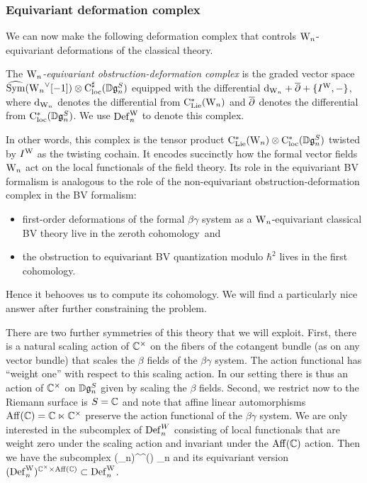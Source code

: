 \subsubsection{Equivariant deformation complex} \label{sec eq def cplx}

We can now make the following deformation complex that controls ${{\rm W}_n}$-equivariant deformations of the classical theory. 

\begin{dfn}
The {\em ${{\rm W}_n}$-equivariant obstruction-deformation complex} is 
the graded vector space $\widehat{{\rm Sym}}({{\rm W}_n}^\vee[-1]) \otimes {\rm C}^\sharp_{\rm loc}(\mathbb D\mathfrak{g}_n^S)$ 
equipped with the differential ${\rm d}_{{{\rm W}_n}} + \overline{\partial} + \{I^{\rm W},-\}$, 
where ${\rm d}_{{{\rm W}_n}}$ denotes the differential from ${\rm C}_{\rm Lie}^*({{\rm W}_n})$
and $\overline{\partial}$ denotes the differential from ${\rm C}^*_{\rm loc}(\mathbb D\mathfrak{g}_n^S)$.
We use ${\rm Def}^{\rm W}_n$ to denote this complex.
\end{dfn}

In other words, this complex is the tensor product ${\rm C}_{\rm Lie}^*({{\rm W}_n}) \otimes {\rm C}^*_{\rm loc}(\mathbb D\mathfrak{g}_n^S)$
twisted by $I^{\rm W}$ as the twisting cochain.
It encodes succinctly how the formal vector fields ${{\rm W}_n}$ act on the local functionals of the field theory.
Its role in the equivariant BV formalism is analogous to the role of the non-equivariant obstruction-deformation complex in the BV formalism:
\begin{itemize}
\item first-order deformations of the formal $\beta\gamma$ system as a ${{\rm W}_n}$-equivariant classical BV theory live in the zeroth cohomology~and
\item the obstruction to equivariant BV quantization modulo $\hbar^2$ lives in the first cohomology.
\end{itemize}
Hence it behooves us to compute its cohomology.
We will find a particularly nice answer after further constraining the problem.

There are two further symmetries of this theory that we will exploit.
First, there is a natural scaling action of $\mathbb C^\times$ on the fibers of the cotangent bundle (as on any vector bundle)
that scales the $\beta$ fields of the $\beta\gamma$ system.
The action functional has ``weight one'' with respect to this scaling action.
In our setting there is thus an action of $\mathbb C^\times$ on $\mathbb D \mathfrak{g}_n^S$ given by scaling the $\beta$ fields. 
Second, we restrict now to the Riemann surface is $S = \mathbb C$ and 
note that affine linear automorphisms ${\rm Aff}(\mathbb C) = \mathbb C \ltimes \mathbb C^\times$ preserve the action functional
of the $\beta\gamma$ system.
We are only interested in the subcomplex of ${\rm Def}^{W}_n$ consisting of local functionals that are weight zero under the scaling action and invariant under the ${\rm Aff}(\mathbb C)$ action.
Then we have the subcomplex
\ben
(\Def_n)^{\CC^\times {}(\CC)} \subset \Def_n
\een
and its equivariant version $({\rm Def}^{\rm W}_n)^{\mathbb C^\times \times {\rm
    Aff}(\mathbb C)} \subset {\rm Def}_n^{\rm W}$.

